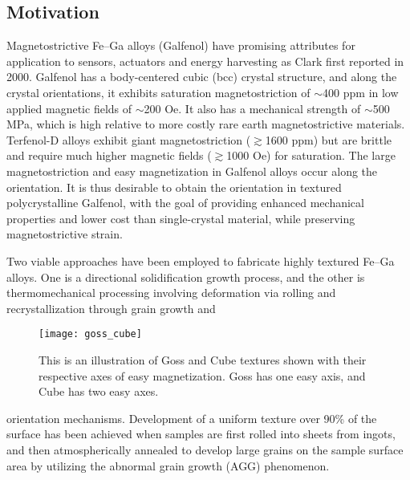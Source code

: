 %
%

\subsection{Motivation}\label{abnormal-grain-growth}
%

 Magnetostrictive Fe–Ga alloys (Galfenol) have promising attributes for application to sensors, actuators and energy harvesting as Clark \etal first reported in 2000\cite{clark2000magnetostrictive}. Galfenol has a body-centered cubic (bcc) crystal structure, and along the  crystal orientations, it exhibits saturation magnetostriction of $\sim$400 ppm in low applied magnetic fields of $\sim$200 Oe. It also has a mechanical strength of $\sim$500 MPa, which is high relative to more costly rare earth magnetostrictive materials. Terfenol-D alloys exhibit giant magnetostriction ($\gtrsim$1600 ppm) but are brittle and require much higher magnetic fields ($\gtrsim$1000 Oe) for saturation\cite{clark2000magnetostrictive,Clark2003,Guruswamy2000}. The large magnetostriction and easy magnetization in Galfenol alloys occur along the  orientation. It is thus desirable to obtain the  orientation in textured polycrystalline Galfenol, with the goal of providing enhanced mechanical properties and lower cost than single-crystal material, while preserving magnetostrictive strain. 




 Two viable approaches have been employed to fabricate highly textured Fe–Ga alloys\cite{srisukhumbowornchai2001large,kellogg2003texture}. One is a directional solidification growth process, and the other is thermomechanical processing involving deformation via rolling and recrystallization through grain growth and  
\begin{figure}[h]
	\centering
	\texttt{[image: goss\_cube]}
	\caption{This is an illustration of Goss and Cube textures shown with their respective axes of easy magnetization. Goss has one easy axis, and Cube has two easy axes.}
	\label{fig:goss_cube}	
\end{figure}
 orientation mechanisms. Development of a uniform texture over 90\% of the surface has been achieved when samples are first rolled into sheets from ingots, and then atmospherically annealed to develop large grains on the sample surface area by utilizing the abnormal grain growth (AGG) phenomenon.\cite{Na2012a,Na2014}


